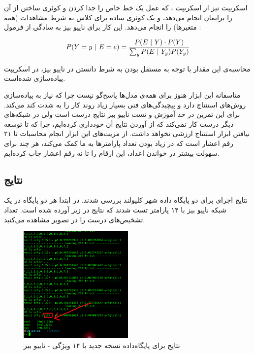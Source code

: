 \documentclass[11.5pt,a4paper]{article}
\begin{document}
اسکریپت  نیز از اسکریپت ،  که عمل یک خط خاص را جدا کردن و کوئری ساختن از آن را برایمان انجام می‌دهد، و  یک کوئری ساده‌ برای کلاس به شرط مشاهدات (همه متغیرها) را انجام می‌دهد. این کار برای ناییو بیز به سادگی از فرمول :

\begin{equation}
P(Y=y \ | \ E = e ) = { {P(E \ | \ Y) \cdot P(Y) } \over {\sum_{y} P(E \ | \ Y_y)P(Y_y)} }
\end{equation}

محاسبه‌ی این مقدار با توجه به مستقل بودن به شرط دانستن  در ناییو بیز، در اسکریپت  پیاده‌سازی شده‌است. 

متاسفانه این ابزار هنوز برای همه‌ی مدل‌ها پاسخ‌گو نیست چرا که نیاز به پیاده‌سازی روش‌های استنتاج دارد و پیچیدگی‌های فنی بسیار زیاد  روند کار را به شدت کند می‌کند. برای این تمرین در حد آموزش و تست ناییو بیز نتایج درست است ولی در شبکه‌های دیگر درست کار نمی‌کند که از آوردن نتایج آن خودداری کرده‌ایم، چرا که تا توسعه نیافتن ابزار استنتاج ارزشی نخواهد داشت. از مزیت‌های این ابزار انجام محاسبات تا ۲۱ رقم اعشار است که در زیاد بودن تعداد پارامترها به ما کمک می‌کند، هر چند برای سهولت بیشتر در خواندن اعداد، این ارقام را تا نه رقم اعشار چاپ کرده‌ایم. 

\subsection{نتایج}

نتایج اجرای  برای دو پایگاه داده شهر کلیولند بررسی شدند. در ابتدا هر دو پایگاه در یک شبکه ناییو بیز با ۱۴ پارامتر تست شدند که نتایج در زیر آورده شده است. تعداد تشخیص‌های درست را در تصویر مشاهده می‌کنید. 

\begin{figure}[h]
\centering
\includegraphics[width=0.5\textwidth]{1}
\caption{نتایج برای پایگاه‌داده نسخه جدید با ۱۴ ویژگی - ناییو بیز}
\label{fig2}
\end{figure}
\end{document}
